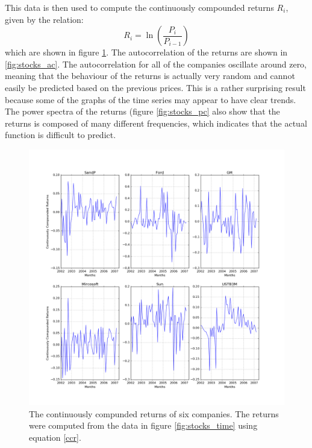 \documentclass[twocolumn]{article}
\begin{document}
This data is then used to compute the continuously compounded returns $R_i$,
given by the relation:
\begin{equation}
  R_i = \ln\left( \frac{P_i}{P_{i-1}} \right)
  \label{ccr}
\end{equation}
which are shown in figure \ref{fig:stocks_returns}. The autocorrelation of the
returns are shown in \ref{fig:stocks_ac}. The autocorrelation for all
of the companies oscillate around zero, meaning that the behaviour of
the returns is actually very random and cannot easily be predicted
based on the previous prices. This is a rather surprising result
because some of the graphs of the time series may appear to have clear
trends. The power spectra of the returns (figure \ref{fig:stocks_pc}
also show that the returns is composed of many different frequencies,
which indicates that the actual function is difficult to predict.

\begin{figure}
  \includegraphics[width=\linewidth]{stocks_returns.png}
  \caption{
    The continuously compunded returns of six companies. The returns were
    computed from the data in figure \ref{fig:stocks_time} using equation
    \ref{ccr}.
  }
  \label{fig:stocks_returns}
\end{figure}
\end{document}
